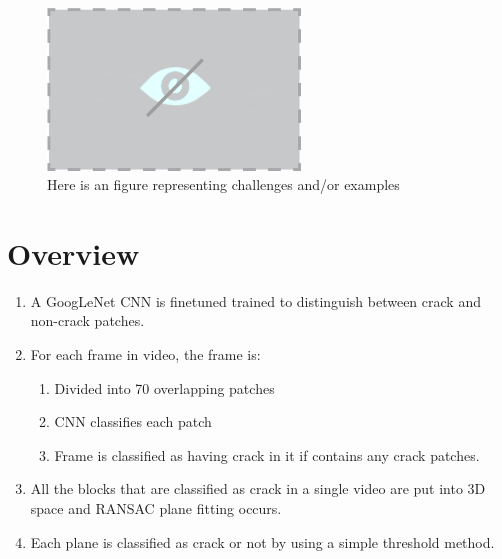 \begin{figure}

    \begin{centering}
        \includegraphics[width=0.6\textwidth]{Images/NoVisualHolder.png}
        
        \caption{Here is an figure representing challenges and/or examples}
        \label{fig:FigChallenges}
    \end{centering}
    
\end{figure}



\section{Overview}

    \begin{enumerate}
        \item A GoogLeNet CNN is finetuned trained to distinguish between crack and non-crack patches.
        \item For each frame in video, the frame is:
            \begin{enumerate}
                \item Divided into 70 overlapping patches
                \item CNN classifies each patch
                \item Frame is classified as having crack in it if contains any crack patches.
            \end{enumerate}
        \item All the blocks that are classified as crack in a single video are put into 3D space and RANSAC plane fitting occurs.
        \item Each plane is classified as crack or not by using a simple threshold method.
    \end{enumerate}


